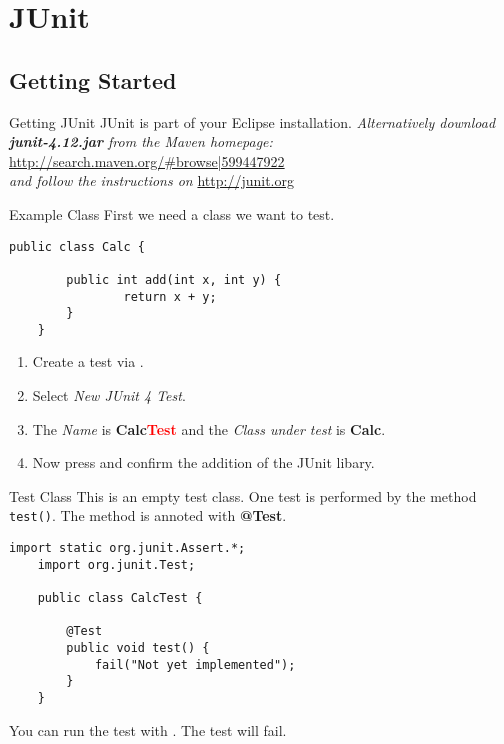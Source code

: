 \section{JUnit}
\subsection{Getting Started}
\begin{frame}{Getting JUnit}
	JUnit is part of your Eclipse installation.
	\vfill
	\emph{Alternatively download \textbf{junit-4.12.jar} from the Maven homepage:}\\
	\url{http://search.maven.org/\#browse|599447922} \\
	\emph{and follow the instructions on} \url{http://junit.org}
\end{frame}

\begin{frame}[fragile]{Example Class}
	First we need a class we want to test.
	\begin{lstlisting}[basicstyle=\ttfamily\scriptsize]
	public class Calc {

	    public int add(int x, int y) {
	        	return x + y;
	    }
	}
	\end{lstlisting}
	\begin{enumerate}
		\item Create a test via .
		\item Select \emph{New JUnit 4 Test}.
		\item The \emph{Name} is \textbf{Calc\textcolor{red}{Test}} and 
				the \emph{Class under test} is \textbf{Calc}.
		\item Now press  and confirm the addition of the JUnit libary.
	\end{enumerate}
\end{frame}

\begin{frame}[fragile]{Test Class}
	This is an empty test class. One test is performed by the method \texttt{test()}. 
	The method is annoted with \textbf{@Test}.
	\begin{lstlisting}[basicstyle=\ttfamily\scriptsize, escapechar=!]
	import static org.junit.Assert.*;
	import org.junit.Test;

	public class CalcTest {

	    @Test
	    public void test() {
	        fail("Not yet implemented");
	    }
	}
	\end{lstlisting}
	You can run the test with . The test will fail.
\end{frame}

